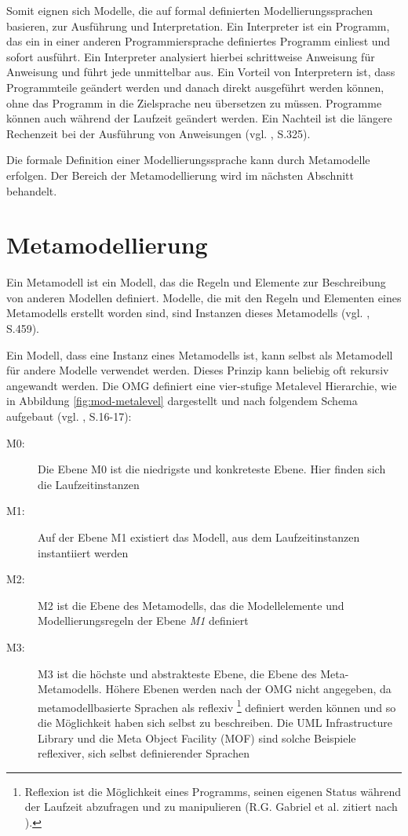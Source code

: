 \label{def-interpreter}
Somit eignen sich Modelle, die auf formal definierten Modellierungssprachen basieren, zur Ausführung und Interpretation. Ein Interpreter ist ein Programm, das ein in einer anderen Programmiersprache definiertes Programm einliest und sofort ausführt. Ein Interpreter analysiert hierbei schrittweise Anweisung für Anweisung und führt jede unmittelbar aus. Ein Vorteil von Interpretern ist, dass Programmteile geändert werden und danach direkt ausgeführt werden können, ohne das Programm in die Zielsprache neu übersetzen zu müssen. Programme können auch während der Laufzeit geändert werden. Ein Nachteil ist die längere Rechenzeit bei der Ausführung von Anweisungen (vgl. \citep{ClausSchwill2006}, S.325).

Die formale Definition einer Modellierungssprache kann durch Metamodelle erfolgen. Der Bereich der Metamodellierung wird im nächsten Abschnitt behandelt.




\section{Metamodellierung}\label{mod-meta}
Ein Metamodell ist ein Modell, das die Regeln und Elemente zur Beschreibung von anderen Modellen definiert. Modelle, die mit den Regeln und Elementen eines Metamodells erstellt worden sind, sind Instanzen dieses Metamodells (vgl. \citep{RumbaughJacobsonBooch2005}, S.459).

Ein Modell, dass eine Instanz eines Metamodells ist, kann selbst als Metamodell für andere Modelle verwendet werden. Dieses Prinzip kann beliebig oft rekursiv angewandt werden. Die OMG definiert eine vier-stufige Metalevel Hierarchie, wie in Abbildung \ref{fig:mod-metalevel} dargestellt und nach folgendem Schema aufgebaut (vgl. \citep{OMG20092}, S.16-17):

\begin{description}
\item[M0:] Die Ebene M0 ist die niedrigste und konkreteste Ebene. Hier finden sich die Laufzeitinstanzen
\item[M1:] Auf der Ebene M1 existiert das Modell, aus dem Laufzeitinstanzen instantiiert werden
\item[M2:] M2 ist die Ebene des Metamodells, das die Modellelemente und Modellierungsregeln der Ebene \emph{M1} definiert
\item[M3:] M3 ist die höchste und abstrakteste Ebene, die Ebene des Meta-Metamodells. Höhere Ebenen werden nach der OMG nicht angegeben, da metamodellbasierte Sprachen als reflexiv
\footnote{Reflexion ist die Möglichkeit eines Programms, seinen eigenen Status während der Laufzeit abzufragen und zu manipulieren (R.G. Gabriel et al. zitiert nach \citep{Rivard1996}).}
definiert werden können und so die Möglichkeit haben sich selbst zu beschreiben. Die UML Infrastructure Library und die Meta Object Facility (MOF) sind solche Beispiele reflexiver, sich selbst definierender Sprachen
\end{description}


